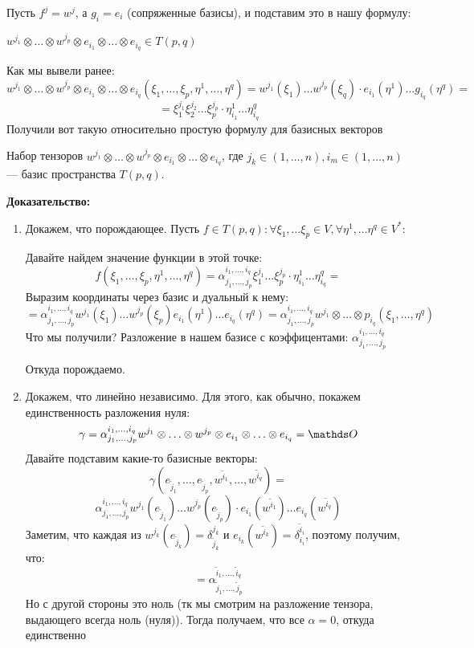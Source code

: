 Пусть $f^j = w^j$, а $g_i = e_i$ (сопряженные базисы), и подставим это в нашу формулу:

$w^{j_1} \otimes \ldots \otimes w^{j_p} \otimes e_{i_1} \otimes \ldots \otimes  e_{i_q}\in T(p,q) $

Как мы вывели ранее:
$$w^{j_1}\otimes \ldots \otimes w^{j_p} \otimes e_{i_1}\otimes \ldots \otimes e_{i_q} (\xi_1,\ldots , \xi_p, \eta^1,\ldots,\eta^q) = w^{j_1}(\xi_1)\ldots w^{j_p}(\xi_q)\cdot e_{i_1}(\eta^1)\ldots g_{i_q}(\eta^q) = $$
$$=\xi_1^{j_1}\xi_2^{j_2}\ldots \xi_p^{j_p} \cdot \eta_{i_1}^1 \ldots \eta_{i_q}^q $$
Получили вот такую относительно простую формулу для базисных векторов



Набор тензоров $w^{j_1}\otimes \ldots \otimes w^{j_p} \otimes e_{i_1}\otimes \ldots \otimes e_{i_q}$, где $j_k \in (1,\ldots,n),i_m\in(1,\ldots,n)$ --- базис пространства $T(p,q)$.

\textbf{Доказательство:}

\begin{enumerate}
    \item Докажем, что порождающее. Пусть $f\in T(p,q): \forall \xi_1,\ldots \xi_p \in V, \forall \eta^1,\ldots \eta^q\in V^*:$

    Давайте найдем значение функции в этой точке:
    $$f(\xi_1,\ldots, \xi_p,\eta^1,\ldots, \eta^q) = \alpha_{j_1,\ldots,j_p}^{i_1,\ldots,i_q}\xi_1^{j_1}\ldots \xi_{p}^{j_p}\cdot \eta_{i_1}^1 \ldots \eta_{i_q}^q = $$
    Выразим координаты через базис и дуальный к нему:
    $$=\alpha_{j_1,\ldots,j_p}^{i_1,\ldots,i_q} w^{j_1}(\xi_1)\ldots w^{j_p}(\xi_p) e_{i_1}(\eta^1)\ldots e_{i_q}(\eta^q) = \alpha_{j_1,\ldots,j_p}^{i_1,\ldots,i_q} w^{j_1}\otimes \ldots \otimes p_{i_q}(\xi_1,\ldots, \eta^q)$$
    Что мы получили? Разложение в нашем базисе с коэффицентами: $\alpha_{j_1,\ldots,j_p}^{i_1,\ldots,i_q} $

    Откуда порождаемо.
    \item Докажем, что линейно независимо. Для этого, как обычно, покажем единственность разложения нуля:
    $$\gamma = \alpha_{j_1,\ldots, j_p}^{i_1,\ldots,i_q}w^{j_1}\otimes\ldots\otimes w^{j_p}\otimes e_{i_1}\otimes \ldots \otimes e_{i_q}=\zero$$
    Давайте подставим какие-то базисные векторы:
    $$\gamma(e_{\widetilde{j}_1},\ldots, e_{\widetilde{j}_p}, w^{\widetilde{i}_1},\ldots, w^{\widetilde{i}_q}) = $$
    $$\alpha_{j_1,\ldots,j_p}^{i_1,\ldots,i_q}w^{j_1}(e_{\widetilde{j}_1})\ldots w^{j_p}(e_{\widetilde{j}_p}) \cdot e_{i_1}(w^{\widetilde{i}_1})\ldots e_{i_q}(w^{\widetilde{i}_q})$$
    Заметим, что каждая из $w^{j_k}(e_{\widetilde{j}_k}) = \delta_{\widetilde{j}_k}^{j_k}$ и $e_{i_k}(w^{\widetilde{i}_k}) = \delta^{\widetilde{i}_i}_{i_i}$, поэтому получим, что:
    $$ = \alpha_{\widetilde{j}_1,\ldots,\widetilde{j}_p}^{\widetilde{i}_1,\ldots, \widetilde{i}_q}$$
    Но с другой стороны это ноль (тк мы смотрим на разложение тензора, выдающего всегда ноль (нуля)). Тогда получаем, что все $\alpha = 0$, откуда единственно
\end{enumerate}

